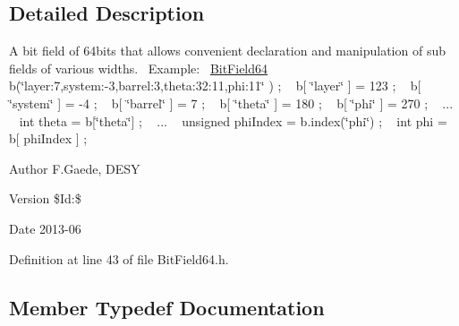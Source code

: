 \subsection{Detailed Description}
A bit field of 64bits that allows convenient declaration and manipulation of sub fields of various widths.~\newline
 Example\+:~\newline
 \hyperlink{class_d_d4hep_1_1_d_d_segmentation_1_1_bit_field64}{Bit\+Field64} b(\char`\"{}layer\+:7,system\+:-\/3,barrel\+:3,theta\+:32\+:11,phi\+:11\char`\"{} ) ; ~\newline
 b\mbox{[} \char`\"{}layer\char`\"{} \mbox{]} = 123 ; ~\newline
 b\mbox{[} \char`\"{}system\char`\"{} \mbox{]} = -\/4 ; ~\newline
 b\mbox{[} \char`\"{}barrel\char`\"{} \mbox{]} = 7 ; ~\newline
 b\mbox{[} \char`\"{}theta\char`\"{} \mbox{]} = 180 ; ~\newline
 b\mbox{[} \char`\"{}phi\char`\"{} \mbox{]} = 270 ; ~\newline
 ... ~\newline
 int theta = b\mbox{[}\char`\"{}theta\char`\"{}\mbox{]} ; ~\newline
 ... ~\newline
 unsigned phi\+Index = b.\+index(\char`\"{}phi\char`\"{}) ; ~\newline
 int phi = b\mbox{[} phi\+Index \mbox{]} ; ~\newline


\begin{DoxyAuthor}{Author}
F.\+Gaede, D\+E\+SY 
\end{DoxyAuthor}
\begin{DoxyVersion}{Version}
\$\+Id\+:\$ 
\end{DoxyVersion}
\begin{DoxyDate}{Date}
2013-\/06 
\end{DoxyDate}


Definition at line 43 of file Bit\+Field64.\+h.



\subsection{Member Typedef Documentation}
\hypertarget{class_d_d4hep_1_1_d_d_segmentation_1_1_bit_field64_a332cc613098802352470f92c7a7c71fd}{}\label{class_d_d4hep_1_1_d_d_segmentation_1_1_bit_field64_a332cc613098802352470f92c7a7c71fd} 
